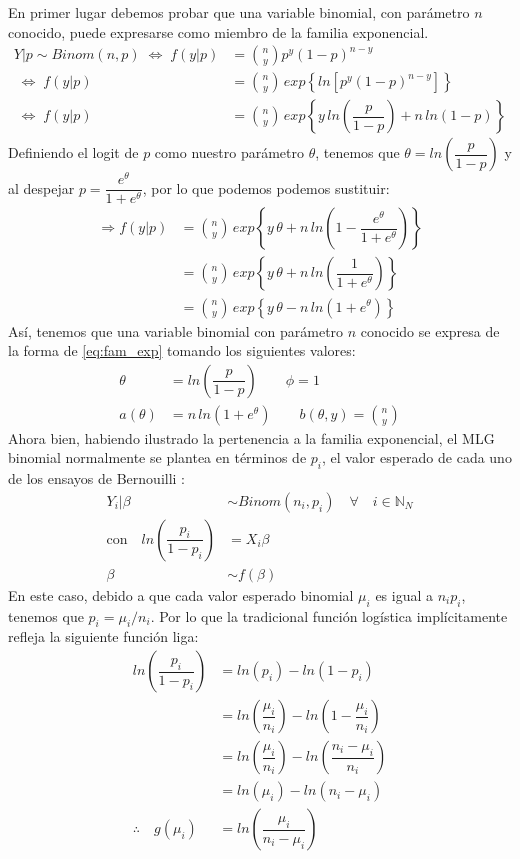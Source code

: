 En primer lugar debemos probar que una variable binomial, con parámetro $n$ conocido, puede expresarse como miembro de la familia exponencial. 
\begin{align*}
Y|p \sim Binom(n,p) \;\Leftrightarrow\; f(y|p) &= {n\choose y}p^y(1-p)^{n-y} \\
\;\Leftrightarrow\; f(y|p) &= {n\choose y}\,exp\left\lbrace ln\left[p^y(1-p)^{n-y}\right]\right\rbrace \\
\;\Leftrightarrow\; f(y|p) &= {n\choose y}\,exp\left\lbrace y\,ln\left(\dfrac{p}{1-p}\right)+n\,ln\left(1-p\right)\right\rbrace
\end{align*}
Definiendo el logit de $p$ como nuestro parámetro $\theta$, tenemos que $\theta = ln\left(\dfrac{p}{1-p}\right)$ y al despejar $p = \dfrac{e^\theta}{1+e^\theta}$, por lo que podemos podemos sustituir: \begin{align} \label{eq:Veros_Binomial}
\Rightarrow f(y|p) &= {n\choose y}\,exp\left\lbrace y\,\theta+n\,ln\left(1-\dfrac{e^\theta}{1+e^\theta}\right)\right\rbrace \nonumber \\
&= {n\choose y}\,exp\left\lbrace y\,\theta+n\,ln\left(\dfrac{1}{1+e^\theta}\right)\right\rbrace \nonumber \\
&= {n\choose y}\,exp\left\lbrace y\,\theta-n\,ln\left(1+e^\theta\right)\right\rbrace
\end{align} 
Así, tenemos que una variable binomial con parámetro $n$ conocido se expresa de la forma de \eqref{eq:fam_exp} tomando los siguientes valores: 
\begin{align*}
\theta &= ln\left(\dfrac{p}{1-p}\right) \qquad \phi = 1\\
a(\theta) &= n\,ln\left(1+e^\theta\right) \qquad b(\theta,y) = {n\choose y}
\end{align*}
Ahora bien, habiendo ilustrado la pertenencia a la familia exponencial, el MLG binomial normalmente se plantea en términos de $p_i$, el valor esperado de cada uno de los ensayos de Bernouilli \parencite{Gelman13}:
\begin{align*}
Y_i|\beta & \sim Binom(n_i,p_i) \quad \forall \quad i \in \mathbb{N}_N \nonumber \\
\text{con} \quad ln\left(\dfrac{p_i}{1-p_i}\right) &= X_i\beta \nonumber \\
\beta &\sim f(\beta)
\end{align*}
En este caso, debido a que cada valor esperado binomial $\mu_i$ es igual a $n_ip_i$, tenemos que $p_i=\mu_i/n_i$. Por lo que la tradicional función logística implícitamente refleja la siguiente función liga: 
\begin{align*}
ln\left(\dfrac{p_i}{1-p_i}\right)&=ln(p_i)-ln(1-p_i)\\
&=ln\left(\dfrac{\mu_i}{n_i}\right)-ln\left(1-\dfrac{\mu_i}{n_i}\right)\\ 
&= ln\left(\dfrac{\mu_i}{n_i}\right)-ln\left(\dfrac{n_i-\mu_i}{n_i}\right)\\
&=ln\left(\mu_i\right)-ln\left(n_i-\mu_i\right)\\ 
\therefore \quad g(\mu_i)&=ln\left(\dfrac{\mu_i}{n_i-\mu_i}\right)
\end{align*}

